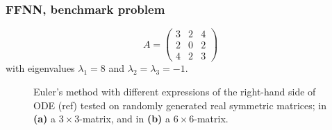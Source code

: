 \subsubsection{FFNN, benchmark problem}

\begin{equation*}
    A = \left(\begin{array}{ccc}
        3 & 2 & 4  \\
        2 & 0 & 2  \\
        4 & 2 & 3
    \end{array}\right)
\end{equation*}
with eigenvalues $\lambda_1 = 8$ and $\lambda_2 = \lambda_3 = -1$.


\begin{figure}[H]
\centering
{}
\qquad
{}
\caption{Euler's method with different expressions of the right-hand side of ODE (ref) tested on randomly generated real symmetric matrices; in \textbf{(a)} a $3\times 3$-matrix, and in \textbf{(b)} a $6\times 6$-matrix.}
\label{fig:euler_benchmark}
\end{figure}